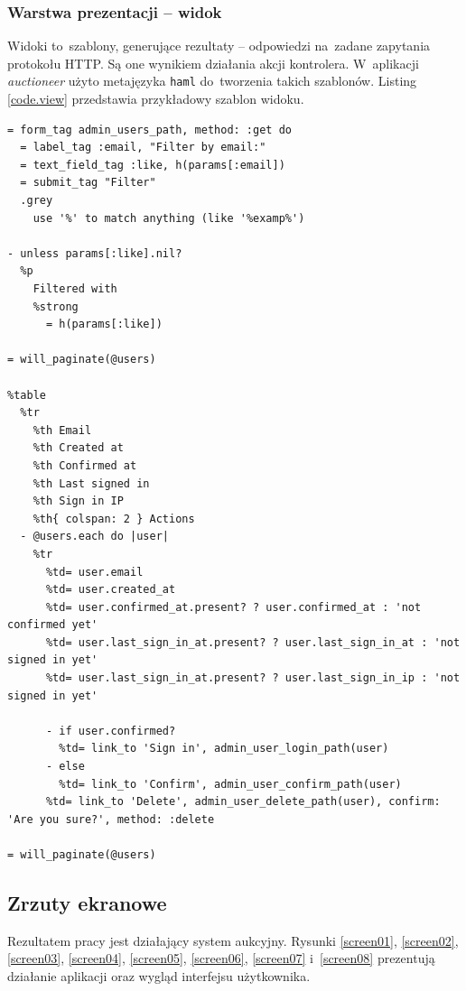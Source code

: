 \subsubsection{Warstwa prezentacji -- widok}

Widoki to~szablony, generujące rezultaty -- odpowiedzi na~zadane zapytania protokołu HTTP. Są one wynikiem działania akcji kontrolera. W~aplikacji \textit{auctioneer} użyto metajęzyka \texttt{haml} do~tworzenia takich szablonów. Listing \ref{code.view} przedstawia przykładowy szablon widoku.

\begin{lstlisting}[label={code.view}]
= form_tag admin_users_path, method: :get do
  = label_tag :email, "Filter by email:"
  = text_field_tag :like, h(params[:email])
  = submit_tag "Filter"
  .grey
    use '%' to match anything (like '%examp%')

- unless params[:like].nil?
  %p
    Filtered with
    %strong
      = h(params[:like])

= will_paginate(@users)

%table
  %tr
    %th Email
    %th Created at
    %th Confirmed at
    %th Last signed in
    %th Sign in IP
    %th{ colspan: 2 } Actions
  - @users.each do |user|
    %tr
      %td= user.email
      %td= user.created_at
      %td= user.confirmed_at.present? ? user.confirmed_at : 'not confirmed yet'
      %td= user.last_sign_in_at.present? ? user.last_sign_in_at : 'not signed in yet'
      %td= user.last_sign_in_at.present? ? user.last_sign_in_ip : 'not signed in yet'

      - if user.confirmed?
        %td= link_to 'Sign in', admin_user_login_path(user)
      - else
        %td= link_to 'Confirm', admin_user_confirm_path(user)
      %td= link_to 'Delete', admin_user_delete_path(user), confirm: 'Are you sure?', method: :delete

= will_paginate(@users)
\end{lstlisting}

\subsection{Zrzuty ekranowe}

Rezultatem pracy jest działający system aukcyjny. Rysunki \ref{screen01}, \ref{screen02}, \ref{screen03}, \ref{screen04}, \ref{screen05}, \ref{screen06}, \ref{screen07} i~\ref{screen08} prezentują działanie aplikacji oraz wygląd interfejsu użytkownika.

